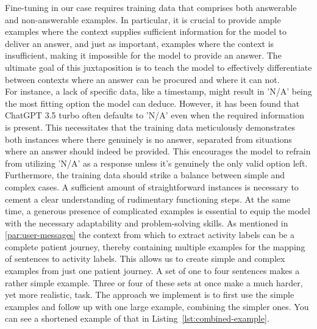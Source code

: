 Fine-tuning in our case requires training data that comprises both answerable and non-answerable examples. In particular, it is crucial to provide ample examples where the context supplies sufficient information for the model to deliver an answer, and just as important, examples where the context is insufficient, making it impossible for the model to provide an answer. The ultimate goal of this juxtaposition is to teach the model to effectively differentiate between contexts where an answer can be procured and where it can not.\\
For instance, a lack of specific data, like a timestamp, might result in 'N/A' being the most fitting option the model can deduce. However, it has been found that ChatGPT 3.5 turbo often defaults to 'N/A' even when the required information is present. This necessitates that the training data meticulously demonstrates both instances where there genuinely is no answer, separated from situations where an answer should indeed be provided. This encourages the model to refrain from utilizing 'N/A' as a response unless it’s genuinely the only valid option left.\\
Furthermore, the training data should strike a balance between simple and complex cases. A sufficient amount of straightforward instances is necessary to cement a clear understanding of rudimentary functioning steps. At the same time, a generous presence of complicated examples is essential to equip the model with the necessary adaptability and problem-solving skills. As mentioned in \ref{par:user-messages} the context from which to extract activity labels can be a complete patient journey, thereby containing multiple examples for the mapping of sentences to activity labels.  This allows us to create simple and complex examples from just one patient journey. A set of one to four sentences makes a rather simple example. Three or four of these sets at once make a much harder, yet more realistic, task. The approach we implement is to first use the simple examples and follow up with one large example, combining the simpler ones. You can see a shortened example of that in Listing~\ref{lst:combined-example}.
